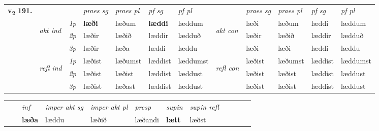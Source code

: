 \begin{tabular}{llllllllllll} \toprule
\multirow{4}{*}{{{\textbf{v{\textsubscript{2}}} \Large{\textbf{191.}}}}}  & &   &  \textit{praes sg}  & \textit{praes pl}  &\textit{ pf sg} & \textit{pf pl} &  &  \textit{praes sg}  & \textit{praes pl}  & \textit{pf sg} & \textit{pf pl } \\*
	\cmidrule{4-7} \cmidrule{9-12}
 & \multirow{3}{*}{\begin{turn}{90}\textit{akt ind}\end{turn}} & {\textit{1p}} & \textbf{læði} & læðum    & \textbf{læddi} & læddum & \multirow{3}{*}{\begin{turn}{90}\textit{akt con}\end{turn}} &læði & læðum & læddi & læddum\\*
& &  {\textit{2p}} &  læðir  & læðið   & læddir & lædduð & & læðir & læðið & læddir & lædduð \\*
& &  {\textit{3p}} & læðir & læða   & læddi & læddu & & læði & læði& læddi & læddu  \\*
\cmidrule{4-7} \cmidrule{9-12}
 &\multirow{3}{*}{\begin{turn}{90}\textit{refl ind}\end{turn}} & {\textit{1p}} & læðist & læðumst    & læddist & læddumst & \multirow{3}{*}{\begin{turn}{90}\textit{refl con}\end{turn}}  &læðist & læðumst & læddist & læddumst\\*
 &&  {\textit{2p}} &  læðist  & læðist   & læddist & læddust & &læðist & læðist & læddist & læddust \\*
& &  {\textit{3p}} & læðist & læðast   & læddist & læddust & & læðist & læðist& læddist & læddust  \\*
\cmidrule{4-7} \cmidrule{9-12}
\end{tabular}


\begin{tabular}{llllllllllll}
 & & \textit{inf} & \textit{imper akt sg} & \textit{imper akt pl}   & \textit{presp} & \textit{supin} & \textit{supin refl}      \\*
  & & \textbf{læða} & læddu  & læðið   & læðandi &  \textbf{lætt} & læðst  \\*
\cmidrule{1-12}
\end{tabular}



